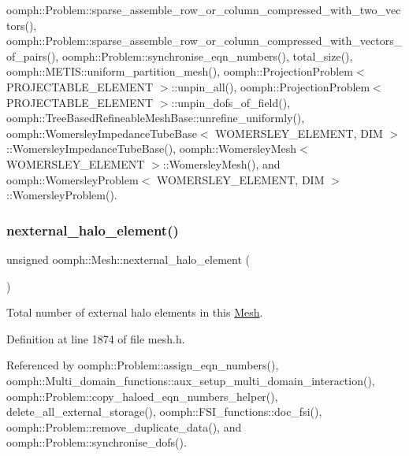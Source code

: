 oomph\+::\+Problem\+::sparse\+\_\+assemble\+\_\+row\+\_\+or\+\_\+column\+\_\+compressed\+\_\+with\+\_\+two\+\_\+vectors(), oomph\+::\+Problem\+::sparse\+\_\+assemble\+\_\+row\+\_\+or\+\_\+column\+\_\+compressed\+\_\+with\+\_\+vectors\+\_\+of\+\_\+pairs(), oomph\+::\+Problem\+::synchronise\+\_\+eqn\+\_\+numbers(), total\+\_\+size(), oomph\+::\+M\+E\+T\+I\+S\+::uniform\+\_\+partition\+\_\+mesh(), oomph\+::\+Projection\+Problem$<$ P\+R\+O\+J\+E\+C\+T\+A\+B\+L\+E\+\_\+\+E\+L\+E\+M\+E\+N\+T $>$\+::unpin\+\_\+all(), oomph\+::\+Projection\+Problem$<$ P\+R\+O\+J\+E\+C\+T\+A\+B\+L\+E\+\_\+\+E\+L\+E\+M\+E\+N\+T $>$\+::unpin\+\_\+dofs\+\_\+of\+\_\+field(), oomph\+::\+Tree\+Based\+Refineable\+Mesh\+Base\+::unrefine\+\_\+uniformly(), oomph\+::\+Womersley\+Impedance\+Tube\+Base$<$ W\+O\+M\+E\+R\+S\+L\+E\+Y\+\_\+\+E\+L\+E\+M\+E\+N\+T, D\+I\+M $>$\+::\+Womersley\+Impedance\+Tube\+Base(), oomph\+::\+Womersley\+Mesh$<$ W\+O\+M\+E\+R\+S\+L\+E\+Y\+\_\+\+E\+L\+E\+M\+E\+N\+T $>$\+::\+Womersley\+Mesh(), and oomph\+::\+Womersley\+Problem$<$ W\+O\+M\+E\+R\+S\+L\+E\+Y\+\_\+\+E\+L\+E\+M\+E\+N\+T, D\+I\+M $>$\+::\+Womersley\+Problem().

\mbox{\label{classoomph_1_1Mesh_af7554deb7f9854272d849a6482a57d60}} 
\subsubsection{\texorpdfstring{nexternal\+\_\+halo\+\_\+element()}{nexternal\_halo\_element()}\hspace{0.1cm}{\footnotesize\ttfamily [1/2]}}
{\footnotesize\ttfamily unsigned oomph\+::\+Mesh\+::nexternal\+\_\+halo\+\_\+element (\begin{DoxyParamCaption}{ }\end{DoxyParamCaption})\hspace{0.3cm}{\ttfamily [inline]}}



Total number of external halo elements in this \hyperlink{classoomph_1_1Mesh}{Mesh}. 



Definition at line 1874 of file mesh.\+h.



Referenced by oomph\+::\+Problem\+::assign\+\_\+eqn\+\_\+numbers(), oomph\+::\+Multi\+\_\+domain\+\_\+functions\+::aux\+\_\+setup\+\_\+multi\+\_\+domain\+\_\+interaction(), oomph\+::\+Problem\+::copy\+\_\+haloed\+\_\+eqn\+\_\+numbers\+\_\+helper(), delete\+\_\+all\+\_\+external\+\_\+storage(), oomph\+::\+F\+S\+I\+\_\+functions\+::doc\+\_\+fsi(), oomph\+::\+Problem\+::remove\+\_\+duplicate\+\_\+data(), and oomph\+::\+Problem\+::synchronise\+\_\+dofs().

